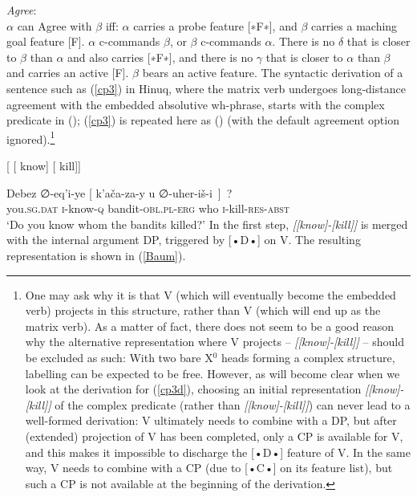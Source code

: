 \documentclass[output=paper
,modfonts
,nonflat]{langsci/langscibook}
\begin{document}
	\ea\label{ex:mueller:29} {\itshape Agree}:\\
	$\alpha$ can Agree with $\beta$ iff:
	\ea $\alpha$ carries a probe feature [∗F∗], and $\beta$ carries a
	maching goal feature [F].
	\ex $\alpha$ \label{agua2}c-commands $\beta$, or $\beta$ c-commands $\alpha$.
	\ex There is \label{agua3}no $\delta$ that is closer to $\beta$ than $\alpha$ and
	also carries [∗F∗], and there is no $\gamma$ that is closer to
	$\alpha$ than $\beta$ and carries an active [F].
	\ex $\beta$ bears an \label{agua4}active feature. 
	\z
	\z
	The syntactic derivation of a sentence such as (\ref{cp3}) in Hinuq,
	where the matrix verb undergoes long-distance agreement with the
	embedded absolutive wh-phrase, starts with the complex predicate in
	(\Next); (\ref{cp3}) is repeated here as (\NNext) (with the default
	agreement option ignored).\footnote{\label{vari2}One may ask why it is
		that V (which will eventually become the embedded verb) projects
		in this structure, rather than V (which will end up as the matrix
		verb).  As a matter of fact, there does not seem to be a good reason
		why the alternative representation where V projects -- {\it
			[\sub{V\sub{1}}[know]-[kill]]} -- should be excluded as such:
		With two bare X$^0$ heads forming a complex structure, labelling can
		be expected to be free. However, as will become clear when we look
		at the derivation for (\ref{cp3d}), choosing an initial representation
		{\itshape [[know]-[kill]]} of the complex predicate
		(rather than {\itshape [[know]-[kill]]}) can never lead
		to a well-formed derivation: V ultimately needs to combine with a
		DP, but after (extended) projection of V has been completed, only
		a CP is available for V, and this makes it impossible to discharge
		the [•D•] feature of V. In the
		same way, V needs to combine with a CP (due to [•C•] on its feature list), but such a
		CP is not available at the beginning of the derivation.}
	
	\ea\relax\label{ex:mueller:30} {[} [ know] [ kill]]\z
	
	\ea\label{ex:mueller:31}  \label{cp3d}
	\gll  Debez ∅-eq'i-ye [ k'a\v{c}a\textgamma -za-y \textbeltl u ∅-uher-i\v{s}-\textbeltl i~]~? \\
	you.{\scshape sg.dat} {\scshape i}-know-{\scshape q} {} bandit-{\scshape obl.pl-erg}   who {\scshape i}-kill-{\scshape res-abst} \\ 
	\glt `Do you know whom the bandits killed?'
	\z
	In the first step, {\itshape [[know]-[kill]]} is merged
	with  the internal argument DP, triggered by  [•D•] on V. The resulting
	representation is shown in (\ref{Baum}).
\end{document}
